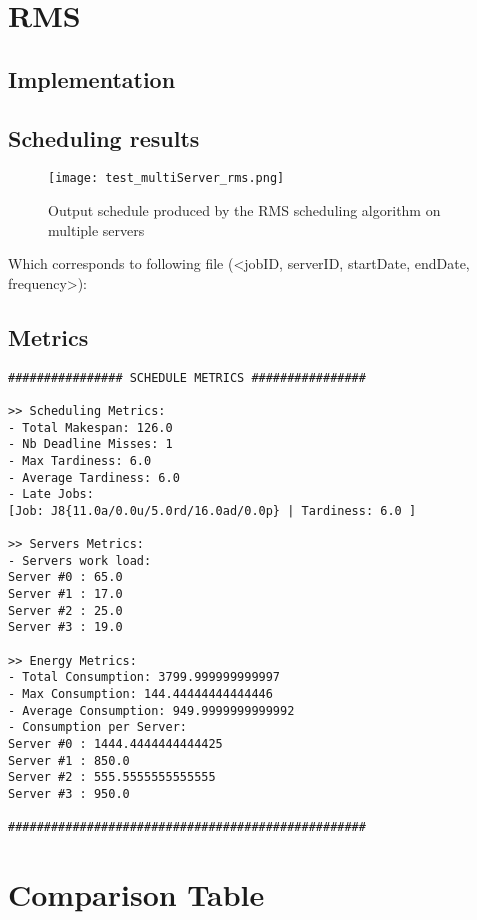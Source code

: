 \documentclass[./report.tex]{subfiles}
\begin{document}
\newpage
\section{RMS}
\subsection{Implementation}

\newpage
\subsection{Scheduling results}
\begin{figure}[!h]
	\center
	\texttt{[image: test\_multiServer\_rms.png]}
	\caption{Output schedule produced by the RMS scheduling algorithm on multiple servers}
	\label{fig:multiServer_rms} 
\end{figure}

Which corresponds to following file (<jobID, serverID, startDate, endDate, frequency>):


\newpage
\subsection{Metrics}
\begin{lstlisting}[style=txt, caption={Metrics for RMS on multiple servers}]
################ SCHEDULE METRICS ################

>> Scheduling Metrics: 
- Total Makespan: 126.0
- Nb Deadline Misses: 1
- Max Tardiness: 6.0
- Average Tardiness: 6.0
- Late Jobs: 
[Job: J8{11.0a/0.0u/5.0rd/16.0ad/0.0p} | Tardiness: 6.0 ]

>> Servers Metrics: 
- Servers work load:
Server #0 : 65.0
Server #1 : 17.0
Server #2 : 25.0
Server #3 : 19.0

>> Energy Metrics: 
- Total Consumption: 3799.999999999997
- Max Consumption: 144.44444444444446
- Average Consumption: 949.9999999999992
- Consumption per Server: 
Server #0 : 1444.4444444444425
Server #1 : 850.0
Server #2 : 555.5555555555555
Server #3 : 950.0

##################################################
\end{lstlisting}


\newpage
\section{Comparison Table}
\end{document}
